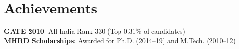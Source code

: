 \section{Achievements}
\textbf{GATE 2010:} All India Rank 330 (Top 0.31\% of candidates)  \\
\textbf{MHRD Scholarships:} Awarded for Ph.D. (2014--19) and M.Tech. (2010--12)